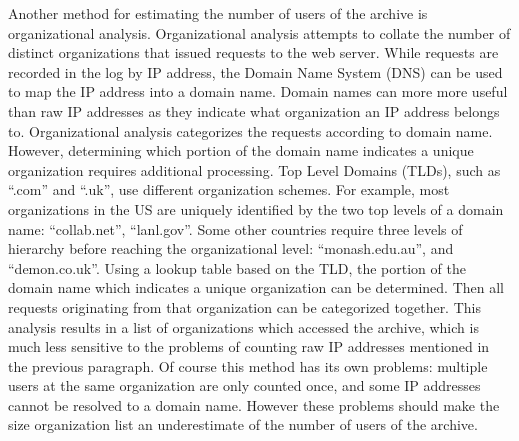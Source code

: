 Another method for estimating the number of users of the archive is
organizational analysis. Organizational analysis attempts to collate the number
of distinct organizations that issued requests to the web server. While
requests are recorded in the log by IP address, the Domain Name System (DNS)
can be used to map the IP address into a domain name. Domain names can more
more useful than raw IP addresses as they indicate what organization an IP
address belongs to. Organizational analysis categorizes the requests according
to domain name. However, determining which portion of the domain name indicates
a unique organization requires additional processing. Top Level Domains (TLDs),
such as ``.com'' and ``.uk'', use different organization schemes. For example,
most organizations in the US are uniquely identified by the two top levels of a
domain name: ``collab.net'', ``lanl.gov''. Some other countries require three
levels of hierarchy before reaching the organizational level:
``monash.edu.au'', and ``demon.co.uk''. Using a lookup table based on the TLD,
the portion of the domain name which indicates a unique organization can be
determined. Then all requests originating from that organization can be
categorized together.  This analysis results in a list of organizations which
accessed the archive, which is much less sensitive to the problems of counting
raw IP addresses mentioned in the previous paragraph. Of course this method has
its own problems: multiple users at the same organization are only counted
once, and some IP addresses cannot be resolved to a domain name. However these
problems should make the size organization list an underestimate of the number
of users of the archive.


